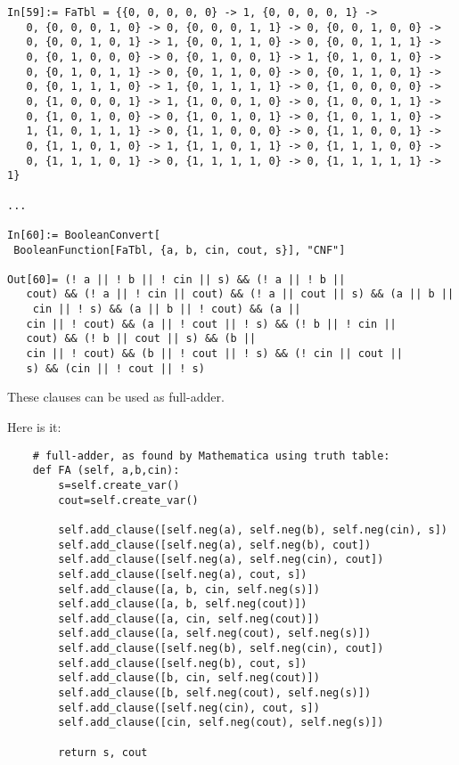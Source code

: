 \begin{lstlisting}
In[59]:= FaTbl = {{0, 0, 0, 0, 0} -> 1, {0, 0, 0, 0, 1} -> 
   0, {0, 0, 0, 1, 0} -> 0, {0, 0, 0, 1, 1} -> 0, {0, 0, 1, 0, 0} -> 
   0, {0, 0, 1, 0, 1} -> 1, {0, 0, 1, 1, 0} -> 0, {0, 0, 1, 1, 1} -> 
   0, {0, 1, 0, 0, 0} -> 0, {0, 1, 0, 0, 1} -> 1, {0, 1, 0, 1, 0} -> 
   0, {0, 1, 0, 1, 1} -> 0, {0, 1, 1, 0, 0} -> 0, {0, 1, 1, 0, 1} -> 
   0, {0, 1, 1, 1, 0} -> 1, {0, 1, 1, 1, 1} -> 0, {1, 0, 0, 0, 0} -> 
   0, {1, 0, 0, 0, 1} -> 1, {1, 0, 0, 1, 0} -> 0, {1, 0, 0, 1, 1} -> 
   0, {1, 0, 1, 0, 0} -> 0, {1, 0, 1, 0, 1} -> 0, {1, 0, 1, 1, 0} -> 
   1, {1, 0, 1, 1, 1} -> 0, {1, 1, 0, 0, 0} -> 0, {1, 1, 0, 0, 1} -> 
   0, {1, 1, 0, 1, 0} -> 1, {1, 1, 0, 1, 1} -> 0, {1, 1, 1, 0, 0} -> 
   0, {1, 1, 1, 0, 1} -> 0, {1, 1, 1, 1, 0} -> 0, {1, 1, 1, 1, 1} -> 1}

...

In[60]:= BooleanConvert[
 BooleanFunction[FaTbl, {a, b, cin, cout, s}], "CNF"]

Out[60]= (! a || ! b || ! cin || s) && (! a || ! b || 
   cout) && (! a || ! cin || cout) && (! a || cout || s) && (a || b ||
    cin || ! s) && (a || b || ! cout) && (a || 
   cin || ! cout) && (a || ! cout || ! s) && (! b || ! cin || 
   cout) && (! b || cout || s) && (b || 
   cin || ! cout) && (b || ! cout || ! s) && (! cin || cout || 
   s) && (cin || ! cout || ! s)
\end{lstlisting}

These clauses can be used as full-adder.

Here is it:

\begin{lstlisting}
    # full-adder, as found by Mathematica using truth table:
    def FA (self, a,b,cin):
        s=self.create_var()
        cout=self.create_var()

        self.add_clause([self.neg(a), self.neg(b), self.neg(cin), s])
        self.add_clause([self.neg(a), self.neg(b), cout])
        self.add_clause([self.neg(a), self.neg(cin), cout])
        self.add_clause([self.neg(a), cout, s])
        self.add_clause([a, b, cin, self.neg(s)])
        self.add_clause([a, b, self.neg(cout)])
        self.add_clause([a, cin, self.neg(cout)])
        self.add_clause([a, self.neg(cout), self.neg(s)])
        self.add_clause([self.neg(b), self.neg(cin), cout])
        self.add_clause([self.neg(b), cout, s])
        self.add_clause([b, cin, self.neg(cout)])
        self.add_clause([b, self.neg(cout), self.neg(s)])
        self.add_clause([self.neg(cin), cout, s])
        self.add_clause([cin, self.neg(cout), self.neg(s)])

        return s, cout
\end{lstlisting}

